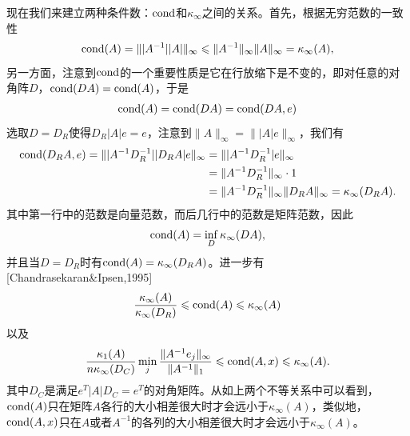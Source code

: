 \documentclass[a4paper,10pt]{ctexart}
\begin{document}
现在我们来建立两种条件数：$ {\rm cond} $和$ \kappa_\infty $之间的关系。首先，根据无穷范数的一致性
\[
    {\rm cond}(A) = \| |A^{-1}||A| \|_\infty\leqslant \| A^{-1} \|_\infty \| A \|_\infty  = \kappa_\infty(A),
\]
另一方面，注意到$ {\rm cond} $的一个重要性质是它在行放缩下是不变的，即对任意的对角阵$ D $，$ {\rm cond}(DA) = {\rm cond}(A) $，于是
\[
    \begin{aligned}
        {\rm cond}(A) = {\rm cond}(DA) = {\rm cond}(DA, e)
    \end{aligned}
\]
选取$ D = D_R $使得$ D_R|A|e = e $，注意到$ \| A \|_\infty = \| |A|e \|_\infty $，我们有
\[
    \begin{aligned}
        {\rm cond}(D_RA, e) = \| |A^{-1}D_R^{-1}| |D_RA|e \|_\infty 
        &= \| |A^{-1}D_R^{-1}|e \|_\infty \\
        &= \| A^{-1} D_R^{-1} \|_\infty \cdot 1\\
        &= \| A^{-1} D_R^{-1} \|_\infty \| D_RA \|_\infty = \kappa_\infty(D_RA) .
    \end{aligned}  
\]
其中第一行中的范数是向量范数，而后几行中的范数是矩阵范数，因此
\begin{equation}
    {\rm cond}(A) = \inf_D \kappa_\infty(DA), 
\end{equation}
并且当$ D = D_R $时有$ {\rm cond}(A) = \kappa_\infty(D_RA) $。进一步有[Chandrasekaran\&Ipsen,1995]
\[
    \frac{\kappa_\infty(A)}{\kappa_\infty(D_R)} \leqslant {\rm cond}(A)\leqslant \kappa_\infty(A)
\]
以及
\[
    \frac{\kappa_1(A)}{n\kappa_\infty(D_C)} \min_j \frac{\| A^{-1}e_j \|_\infty}{\| A^{-1} \|_1}\leqslant {\rm cond}(A,x) \leqslant \kappa_\infty(A).
\]
其中$ D_C $是满足$ e^T|A|D_C = e^T $的对角矩阵。从如上两个不等关系中可以看到，$ {\rm cond}(A) $只在矩阵$ A $各行的大小相差很大时才会远小于$ \kappa_\infty(A) $，类似地，$ {\rm cond}(A,x) $只在$ A $或者$ A^{-1} $的各列的大小相差很大时才会远小于$ \kappa_\infty(A) $。 
\end{document}
